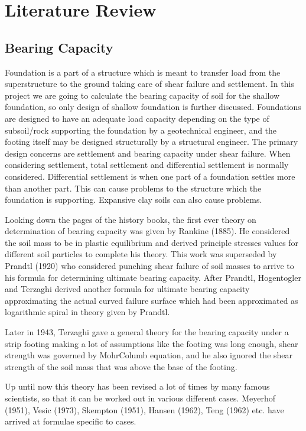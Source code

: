 \chapter{Literature Review}
\section{Bearing Capacity}
Foundation is a part of a structure which is meant to transfer load from the superstructure to the ground taking care of shear failure and settlement. In this project we are going to calculate the bearing capacity of soil for the shallow foundation, so only design of shallow foundation is further discussed. Foundations are designed to have an adequate load capacity depending on the type of subsoil/rock supporting the foundation by a geotechnical engineer, and the footing itself may be designed structurally by a structural engineer. The primary design concerns are settlement and bearing capacity under shear failure. When considering settlement, total settlement and differential settlement is normally considered. Differential settlement is when one part of a foundation settles more than another part. This can cause problems to the structure which the foundation is supporting. Expansive clay soils can also cause problems.

Looking down the pages of the history books, the first ever theory on determination of bearing capacity was given by Rankine (1885). He considered the soil mass to be in plastic equilibrium and derived principle stresses values for different soil particles to complete his theory. This work was superseded by Prandtl (1920) who considered punching shear failure of soil masses to arrive to his formula for determining ultimate bearing capacity. After Prandtl, Hogentogler and Terzaghi derived another formula for ultimate bearing capacity approximating the actual curved failure surface which had been approximated as logarithmic spiral in theory given by Prandtl.\cite{arora_soil_2004}
\par
Later in 1943, Terzaghi gave a general theory for the bearing capacity under a strip footing making a lot of assumptions like the footing was long enough, shear strength was governed by Mohr\-Columb equation, and he also ignored the shear strength of the soil mass that was above the base of the footing.\cite{arora_soil_2004}
\par
Up until now this theory has been revised a lot of times by many famous scientists, so that it can be worked out in various different cases. Meyerhof (1951), Vesic (1973), Skempton (1951), Hansen (1962), Teng (1962) etc. have arrived at formulae specific to cases.\cite{arora_soil_2004}
\par

